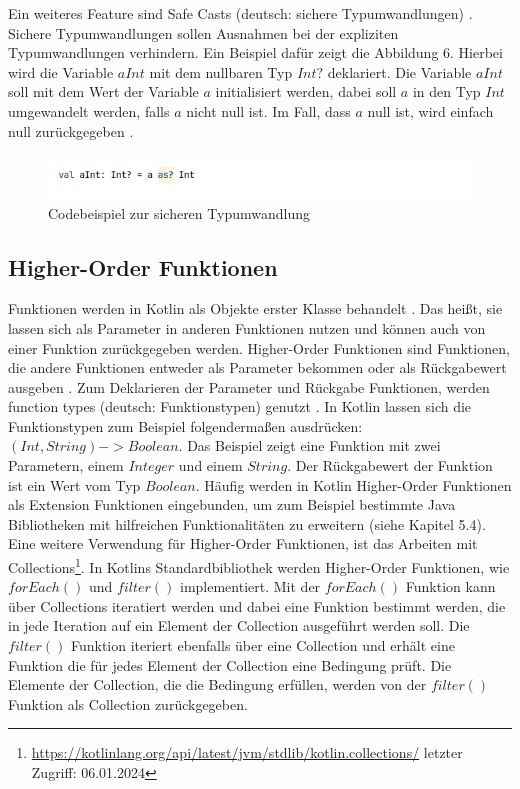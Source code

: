 \documentclass{article}
\begin{document}
\newline
Ein weiteres Feature sind Safe Casts (deutsch: sichere Typumwandlungen) \cite{KotlinLangNullSafety}. Sichere Typumwandlungen sollen Ausnahmen bei der expliziten Typumwandlungen verhindern. Ein Beispiel dafür zeigt die Abbildung 6. Hierbei wird die Variable $aInt$ mit dem nullbaren Typ $Int?$ deklariert. Die Variable $aInt$ soll mit dem Wert der Variable $a$ initialisiert werden, dabei soll $a$ in den Typ $Int$ umgewandelt werden, falls $a$ nicht null ist. Im Fall, dass $a$ null ist, wird einfach null zurückgegeben \cite{KotlinLangNullSafety}.
\begin{figure}[!htb]
    \raggedright
    \includegraphics[width=\linewidth]{img/safe_cast.png}
    \caption{Codebeispiel zur sicheren Typumwandlung\footnotemark}
\end{figure}

\subsection{Higher-Order Funktionen}
Funktionen werden in Kotlin als Objekte erster Klasse behandelt \cite{KotlinLangDocHigherOrder}. Das heißt, sie lassen sich als Parameter in anderen Funktionen nutzen und können auch von einer Funktion zurückgegeben werden. Higher-Order Funktionen sind Funktionen, die andere Funktionen entweder als Parameter bekommen oder als Rückgabewert ausgeben \cite{KotlinLangDocHigherOrder}. Zum Deklarieren der Parameter und Rückgabe Funktionen, werden function types (deutsch: Funktionstypen) genutzt \cite{KotlinLangDocHigherOrder}. In Kotlin lassen sich die Funktionstypen zum Beispiel folgendermaßen ausdrücken: $(Int, String) -> Boolean$. Das Beispiel zeigt eine Funktion mit zwei Parametern, einem $Integer$ und einem $String$. Der Rückgabewert der Funktion ist ein Wert vom Typ $Boolean$. Häufig werden in Kotlin Higher-Order Funktionen als Extension Funktionen eingebunden, um zum Beispiel bestimmte Java Bibliotheken mit hilfreichen Funktionalitäten zu erweitern (siehe Kapitel 5.4). Eine weitere Verwendung für Higher-Order Funktionen, ist das Arbeiten mit Collections\footnote{\url{https://kotlinlang.org/api/latest/jvm/stdlib/kotlin.collections/} letzter Zugriff: 06.01.2024}. In Kotlins Standardbibliothek werden Higher-Order Funktionen, wie $forEach()$ und $filter()$ implementiert. Mit der $forEach()$ Funktion kann über Collections iteratiert werden und dabei eine Funktion bestimmt werden, die in jede Iteration auf ein Element der Collection ausgeführt werden soll. Die $filter()$ Funktion iteriert ebenfalls über eine Collection und erhält eine Funktion die für jedes Element der Collection eine Bedingung prüft. Die Elemente der Collection, die die Bedingung erfüllen, werden von der $filter()$ Funktion als Collection zurückgegeben.
\end{document}
